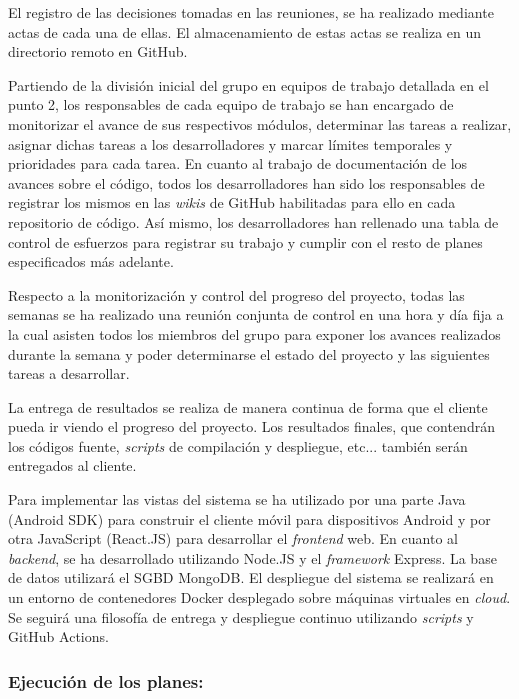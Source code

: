 \documentclass{article}
\begin{document}
El registro de las decisiones tomadas en las reuniones, se ha realizado mediante actas de cada una de ellas. El almacenamiento de estas actas se realiza en un directorio remoto en GitHub.
 
Partiendo de la división inicial del grupo en equipos de trabajo detallada en el punto 2, los responsables de cada equipo de trabajo se han encargado de monitorizar el avance de sus respectivos módulos, determinar las tareas a realizar, asignar dichas tareas a los desarrolladores y marcar límites temporales y prioridades para cada tarea. En cuanto al trabajo de documentación de los avances sobre el código, todos los desarrolladores han sido los responsables de registrar los mismos en las \textit{wikis} de GitHub habilitadas para ello en cada repositorio de código. Así mismo, los desarrolladores han rellenado una tabla de control de esfuerzos para registrar su trabajo y cumplir con el resto de planes especificados más adelante.
 
\pagebreak
 
Respecto a la monitorización y control del progreso del proyecto, todas las semanas se ha realizado una reunión conjunta de control en una hora y día fija a la cual asisten todos los miembros del grupo para exponer los avances realizados durante la semana y poder determinarse el estado del proyecto y las siguientes tareas a desarrollar.
 
La entrega de resultados se realiza de manera continua de forma que el cliente pueda ir viendo el progreso del proyecto. Los resultados finales, que contendrán los códigos fuente, \textit{scripts} de compilación y despliegue, etc... también serán entregados al cliente.
 
Para implementar las vistas del sistema se ha utilizado por una parte Java (Android SDK) para construir el cliente móvil para dispositivos Android y por otra JavaScript (React.JS) para desarrollar el \textit{frontend} web. En cuanto al \textit{backend}, se ha desarrollado utilizando Node.JS y el \textit{framework} Express. La base de datos utilizará el SGBD MongoDB. El despliegue del sistema se realizará en un entorno de contenedores Docker desplegado sobre máquinas virtuales en \textit{cloud}. Se seguirá una filosofía de entrega y despliegue continuo utilizando \textit{scripts} y GitHub Actions.
 
\subsubsection*{Ejecución de los planes:}
 
\end{document}
